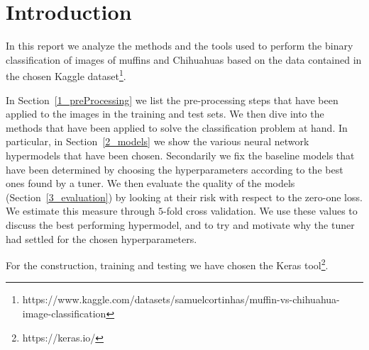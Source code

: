 \setcounter{section}{-1}
\section{Introduction}\label{0:introduction}
In this report we analyze the methods and the tools used to perform the binary classification of images of muffins and Chihuahuas based on the data contained in the chosen Kaggle dataset\footnote{https://www.kaggle.com/datasets/samuelcortinhas/muffin-vs-chihuahua-image-classification}. 

In Section~\ref{1_preProcessing} we list the pre-processing steps that have been applied to the images in the training and test sets. We then dive into the methods that have been applied to solve the classification problem at hand. In particular, in Section~\ref{2_models} we show the various neural network hypermodels that have been chosen. Secondarily we fix the baseline models that have been determined by choosing the hyperparameters according to the best ones found by a tuner. We then evaluate the quality of the models (Section~\ref{3_evaluation}) by looking at their risk with respect to the zero-one loss. We estimate this measure through $5$-fold cross validation. We use these values to discuss the best performing hypermodel, and to try and motivate why the tuner had settled for the chosen hyperparameters.

For the construction, training and testing we have chosen the Keras tool\footnote{https://keras.io/}.